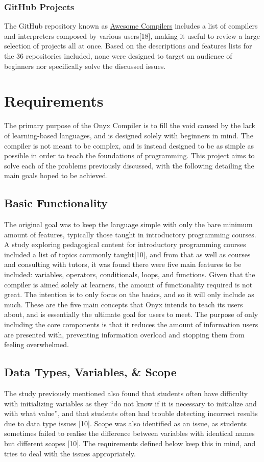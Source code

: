 \documentclass[
]{report}
\begin{document}
\subsection{GitHub Projects}
The GitHub repository known as
\href{https://github.com/rsumner31/awesome-compilers}{Awesome Compilers}
includes a list of compilers and interpreters composed by various
users{[}18{]}, making it useful to review a large selection of projects
all at once. Based on the descriptions and features lists for the 36
repositories included, none were designed to target an audience of
beginners nor specifically solve the discussed issues.

\chapter{Requirements}
The primary purpose of the Onyx Compiler is to fill the void caused by
the lack of learning-based languages, and is designed solely with
beginners in mind. The compiler is not meant to be complex, and is
instead designed to be as simple as possible in order to teach the
foundations of programming. This project aims to solve each of the
problems previously discussed, with the following detailing the main
goals hoped to be achieved.

\section{Basic Functionality}
The original goal was to keep the language simple with only the bare
minimum amount of features, typically those taught in introductory
programming courses. A study exploring pedagogical content for
introductory programming courses included a list of topics commonly
taught{[}10{]}, and from that as well as courses and consulting with
tutors, it was found there were five main features to be included:
variables, operators, conditionals, loops, and functions. Given that the
compiler is aimed solely at learners, the amount of functionality
required is not great. The intention is to only focus on the basics, and
so it will only include as much. These are the five main concepts that
Onyx intends to teach its users about, and is essentially the ultimate
goal for users to meet. The purpose of only including the core
components is that it reduces the amount of information users are
presented with, preventing information overload and stopping them from
feeling overwhelmed.

\section{Data Types, Variables, \& Scope}
The study previously mentioned also found that students often have
difficulty with initializing variables as they ``do not know if it is
necessary to initialize and with what value'', and that students often
had trouble detecting incorrect results due to data type issues
{[}10{]}. Scope was also identified as an issue, as students sometimes
failed to realise the difference between variables with identical names
but different scopes {[}10{]}. The requirements defined below keep this
in mind, and tries to deal with the issues appropriately.
\end{document}
